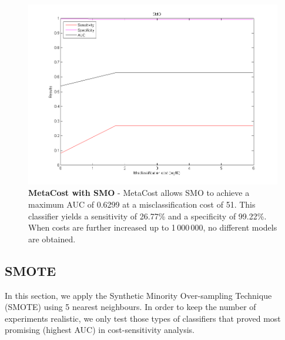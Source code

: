\newpage
\begin{figure}[h]
\includegraphics[scale=0.65]{img/MC_SMO.png}
\caption{\textbf{MetaCost with SMO} - MetaCost allows SMO to achieve a maximum AUC of 0.6299 at a misclassification cost of 51. This classifier yields a sensitivity of 26.77\% and a specificity of 99.22\%. When costs are further increased up to 1\,000\,000, no different models are obtained.}
\end{figure}


\newpage
\subsection{SMOTE}\label{exp-SMOTE}
In this section, we apply the Synthetic Minority Over-sampling Technique (SMOTE) using 5 nearest neighbours. In order to keep the number of experiments realistic, we only test those types of classifiers that proved most promising (highest AUC) in cost-sensitivity analysis.

